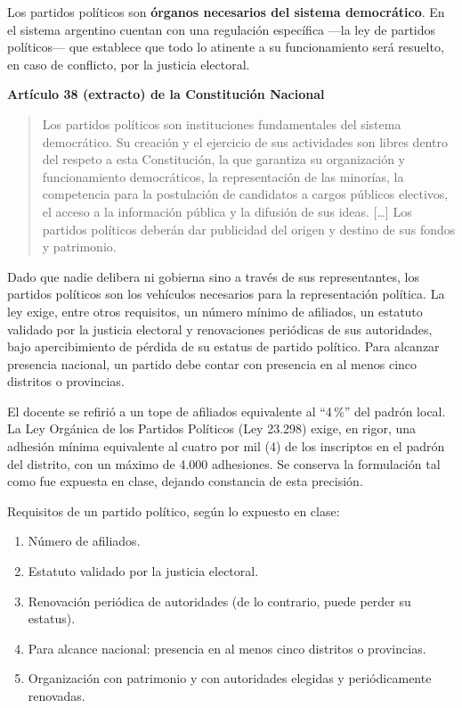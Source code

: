 \documentclass[12pt,oneside]{book}
\newenvironment{normacitada}[1]{%
    \medskip
    \noindent\textbf{#1}\par\smallskip
    \begin{quote}\itshape
}{%
    \end{quote}
    \medskip
}
\begin{document}
Los partidos políticos son \textbf{órganos necesarios del sistema democrático}. En el sistema argentino cuentan con una regulación específica —la ley de partidos políticos— que establece que todo lo atinente a su funcionamiento será resuelto, en caso de conflicto, por la justicia electoral.

\begin{normacitada}{Artículo 38 (extracto) de la Constitución Nacional}
Los partidos políticos son instituciones fundamentales del sistema democrático. Su creación y el ejercicio de sus actividades son libres dentro del respeto a esta Constitución, la que garantiza su organización y funcionamiento democráticos, la representación de las minorías, la competencia para la postulación de candidatos a cargos públicos electivos, el acceso a la información pública y la difusión de sus ideas. [\ldots] Los partidos políticos deberán dar publicidad del origen y destino de sus fondos y patrimonio.
\end{normacitada}

Dado que nadie delibera ni gobierna sino a través de sus representantes, los partidos políticos son los vehículos necesarios para la representación política. La ley exige, entre otros requisitos, un número mínimo de afiliados, un estatuto validado por la justicia electoral y renovaciones periódicas de sus autoridades, bajo apercibimiento de pérdida de su estatus de partido político. Para alcanzar presencia nacional, un partido debe contar con presencia en al menos cinco distritos o provincias.

\begin{note}
El docente se refirió a un tope de afiliados equivalente al ``4\,\%'' del padrón local. La Ley Orgánica de los Partidos Políticos (Ley 23.298) exige, en rigor, una adhesión mínima equivalente al cuatro por mil (4\textperthousand) de los inscriptos en el padrón del distrito, con un máximo de 4.000 adhesiones. Se conserva la formulación tal como fue expuesta en clase, dejando constancia de esta precisión.
\end{note}

\begin{important}
Requisitos de un partido político, según lo expuesto en clase:
\begin{enumerate}[label=\alph*)]
\item Número de afiliados.
\item Estatuto validado por la justicia electoral.
\item Renovación periódica de autoridades (de lo contrario, puede perder su estatus).
\item Para alcance nacional: presencia en al menos cinco distritos o provincias.
\item Organización con patrimonio y con autoridades elegidas y periódicamente renovadas.
\end{enumerate}
\end{important}
\end{document}
